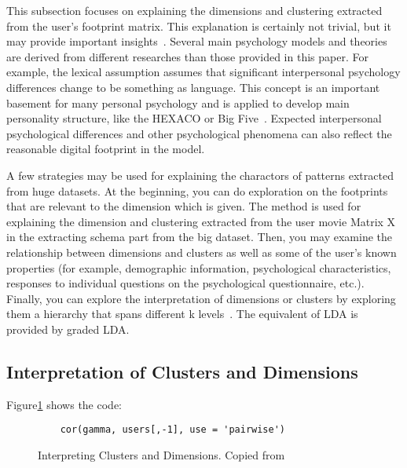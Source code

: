 This subsection focuses on explaining the dimensions and clustering
 extracted 
from the user's footprint matrix. This explanation is certainly not
 trivial, but it may provide important insights~\cite{hid515-12}. 
Several main
psychology models and theories are derived from different 
researches than those provided in this paper. For example, the 
lexical assumption assumes that significant interpersonal 
psychology differences change to be something as language. 
This concept
 is an important basement for many personal psychology and is
 applied to develop main personality structure, like the HEXACO or Big
 Five~\cite{hid515-12}. 
Expected interpersonal psychological differences and other 
psychological phenomena can also reflect the reasonable digital 
footprint in the model.

A few strategies may be used for explaining the charactors of 
patterns extracted from huge datasets. At the beginning, 
you can do exploration on the 
footprints that are relevant to the dimension which is given.
 The method is used for explaining the dimension and clustering 
extracted from the user movie Matrix X in the extracting schema 
part from the big dataset. 
Then, you may examine the 
relationship between dimensions and clusters as well as some of 
the user's known properties (for example, demographic information,
 psychological characteristics, responses to individual questions 
on the psychological questionnaire, etc.). Finally, you can 
explore the interpretation of dimensions or clusters by exploring 
them a hierarchy that spans different k levels~\cite{hid515-12}. 
The equivalent of LDA is provided by graded LDA.

\subsection{Interpretation of Clusters and Dimensions~\cite{hid515-12}}

Figure\ref{F:interpreting} shows the code:

\begin{figure}[htb]
\begin{footnotesize}
\begin{verbatim}
    cor(gamma, users[,-1], use = 'pairwise')
\end{verbatim}
\end{footnotesize}
\caption{Interpreting Clusters and Dimensions. 
Copied from~\cite{hid515-12}}
\label{F:interpreting}
\end{figure}


